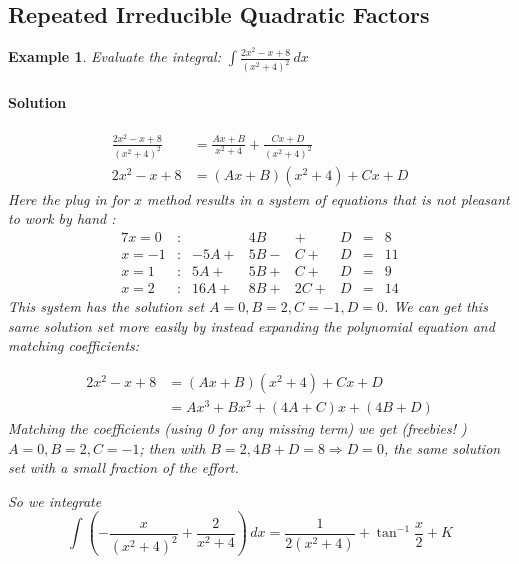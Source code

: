 \documentclass[letterpaper, 11pt, openany]{book}
\theoremstyle{mytheoremstyle}
\theoremstyle{myexamplestyle}
\newtheorem{example}{Example}[section]
\newenvironment{solution}{\paragraph{\sffamily \smaller \fontseries{b}\selectfont Solution}}{\hfill\faSquare}
\begin{document}
\subsection{Repeated Irreducible Quadratic Factors}
\begin{example}\label{e:parfracrepirred}
    Evaluate the integral: $\displaystyle \int \frac{2x^{2} - x + 8}{(x^{2} + 4)^{2}} \, dx$
    
    \begin{solution}
        \begin{align*}
            \frac{2x^{2} - x + 8}{(x^{2} + 4)^{2}} &= \frac{Ax + B}{x^{2} + 4} + \frac{Cx + D}{(x^{2} + 4)^{2}}\\[2ex]
            2x^{2} - x + 8 &= (Ax + B)(x^{2} + 4) + Cx + D
        \end{align*}
        Here the plug in for \(x\) method results in a system of equations that is not pleasant to work by hand \faFrown:    
        \begin{alignat*}{7}
            x = 0 &: & {} {} &4B {} {}  & {}+{} &D &{}={} &8\\
            x = -1 &: &-5A {}+{} &5B {}-{} &C {}+{} &D &{}={} &11\\
            x = 1&: &5A {}+{} &5B {}+{} &C {}+{} &D &{}={} &9\\
            x = 2 &: &16A {}+{} &8B {}+{} &2C {}+{} &D  &{}={} &14
        \end{alignat*}
        This system has the solution set $A = 0, B = 2, C = -1, D = 0$. We can get this same solution set more easily by instead expanding the polynomial equation and matching coefficients:
        
        \begin{align*}
            2x^{2} - x + 8  &= (Ax + B)(x^{2} + 4) + Cx + D\\
                            &= Ax^{3} + Bx^{2} + (4A + C)x + (4B+D)
        \end{align*}
        Matching the coefficients (using 0 for any missing term) we get (freebies! \faSmile) \(A = 0, B = 2, C = -1\); then with \(B=2, 4B+D = 8 \Rightarrow D = 0\), the same solution set with a small fraction of the effort.

        So we integrate
        \[\int \left( -\frac{x}{(x^{2} + 4)^{2}} + \frac{2}{x^{2} + 4} \right) \, dx = \frac{1}{2(x^{2} + 4)} + \tan^{-1} \frac{x}{2} + K\]
    \end{solution}
\end{example}
\end{document}
